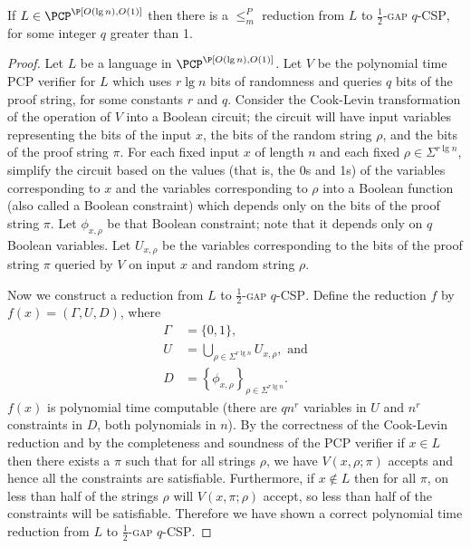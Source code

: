 \documentclass[]{article}
\begin{document}
\begin{lemma}\label{lem:constraintsp}
  If $L \in \PCP^\P[O(\lg n), O(1)]$ then there is a $\leq_m^P$ reduction from $L$ to \textsc{$\frac{1}{2}$-gap $q$-CSP}, for some integer $q$ greater than 1.
\end{lemma}
\begin{proof}
  Let $L$ be a language in $\PCP^\P[O(\lg n), O(1)]$.
  Let $V$ be the polynomial time PCP verifier for $L$ which uses $r \lg n$ bits of randomness and queries $q$ bits of the proof string, for some constants $r$ and $q$.
  Consider the Cook-Levin transformation of the operation of $V$ into a Boolean circuit; the circuit will have input variables representing the bits of the input $x$, the bits of the random string $\rho$, and the bits of the proof string $\pi$.
  For each fixed input $x$ of length $n$ and each fixed $\rho \in \Sigma^{r \lg n}$, simplify the circuit based on the values (that is, the 0s and 1s) of the variables corresponding to $x$ and the variables corresponding to $\rho$ into a Boolean function (also called a Boolean constraint) which depends only on the bits of the proof string $\pi$.
  Let $\phi_{x, \rho}$ be that Boolean constraint; note that it depends only on $q$ Boolean variables.
  Let $U_{x, \rho}$ be the variables corresponding to the bits of the proof string $\pi$ queried by $V$ on input $x$ and random string $\rho$.

  Now we construct a reduction from $L$ to \textsc{$\frac{1}{2}$-gap $q$-CSP}.
  Define the reduction $f$ by $f(x) = (\Gamma, U, D)$, where
  \begin{align*}
    \Gamma & = \{0, 1\}, \\
    U & = \bigcup_{\rho \in \Sigma^{r \lg n}}{U_{x, \rho}}, \text{ and} \\
    D & = \left\{\phi_{x, \rho}\right\}_{\rho \in \Sigma^{r \lg n}}.
  \end{align*}
  $f(x)$ is polynomial time computable (there are $qn^r$ variables in $U$ and $n^r$ constraints in $D$, both polynomials in $n$).
  By the correctness of the Cook-Levin reduction and by the completeness and soundness of the PCP verifier if $x \in L$ then there exists a $\pi$ such that for all strings $\rho$, we have $V(x, \rho; \pi)$ accepts and hence all the constraints are satisfiable.
  Furthermore, if $x \notin L$ then for all $\pi$, on less than half of the strings $\rho$ will $V(x, \pi; \rho)$ accept, so less than half of the constraints will be satisfiable.
  Therefore we have shown a correct polynomial time reduction from $L$ to \textsc{$\frac{1}{2}$-gap $q$-CSP}.
\end{proof}
\end{document}
